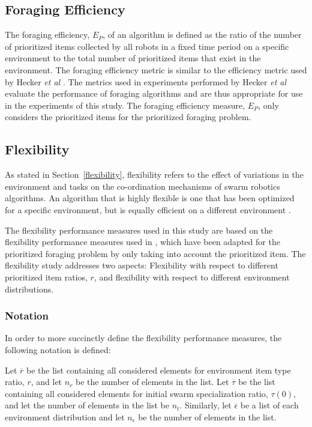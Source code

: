 \subsection{Foraging Efficiency}
\label{setup:foragingefficiency}
The foraging efficiency, $E_P$, of an algorithm is defined as the ratio of the number of prioritized items collected by all robots in a fixed time period on a specific environment to the total number of prioritized items that exist in the environment. The foraging efficiency metric is similar to the efficiency metric used by Hecker \textit{et al} \cite{hecker2015beyond}. The metrics used in experiments performed by Hecker \textit{et al} evaluate the performance of foraging algorithms and are thus appropriate for use in the experiments of this study. The foraging efficiency measure, $E_P$, only considers the prioritized items for the prioritized foraging problem.


\subsection{Flexibility}
\label{setup:flexibility}

As stated in Section~\ref{flexibility}, flexibility refers to the effect of variations in the environment and tasks on the co-ordination mechanisms of swarm robotics algorithms. An algorithm that is highly flexible is one that has been optimized for a specific environment, but is equally efficient on a different environment \cite{hecker2015beyond}.

The flexibility performance measures used in this study are based on the flexibility performance measures used in \cite{hecker2015beyond}, which have been adapted for the prioritized foraging problem by only taking into account the prioritized item. The flexibility study addresses two aspects: Flexibility with respect to different prioritized item ratios, $r$, and flexibility with respect to different environment distributions.

\subsubsection{Notation}

In order to more succinctly define the flexibility performance measures, the following notation is defined:

Let $\overline{r}$ be the list containing all considered elements for environment item type ratio, $r$, and let $n_r$ be the number of elements in the list. Let $\overline{\tau}$ be the list containing all considered elements for initial swarm specialization ratio, $\tau(0)$, and let the number of elements in the list be $n_t$. Similarly, let $\overline{\epsilon}$ be a list of each environment distribution and let $n_\epsilon$ be the number of elements in the list.

